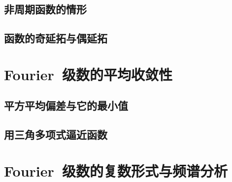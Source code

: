 \subsection{非周期函数的情形}
\subsection{函数的奇延拓与偶延拓}
\begin{exercise}
\item
\end{exercise}
\section{Fourier~级数的平均收敛性}
\subsection{平方平均偏差与它的最小值}
\subsection{用三角多项式逼近函数}
\begin{exercise}
\item
\end{exercise}
\section{Fourier~级数的复数形式与频谱分析}
\begin{exercise*}
\item
\end{exercise*}




\endinput
